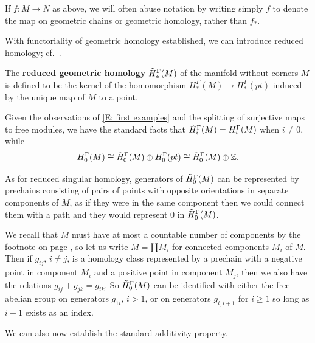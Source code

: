 If $f \colon M \to N$ as above, we will often abuse notation by writing simply $f$ to denote the map on geometric chains or geometric homology, rather than $f_*$.

With functoriality of geometric homology established, we can introduce reduced homology; cf.\ \cite[page 200]{Span81}.

\begin{definition}\label{D: reduced}
	The \textbf{reduced geometric homology} $\tilde H_*^\Gamma(M)$ of the manifold without corners $M$ is defined to be the kernel of the homomorphism $H_*^\Gamma(M) \to H_*^\Gamma(pt)$ induced by the unique map of $M$ to a point.
\end{definition}

\begin{remark}\label{R: reduced h}
Given the observations of \cref{E: first examples} and the splitting of surjective maps to free modules, we have the standard facts that $\tilde H_i^\Gamma(M) = H_i^\Gamma(M)$ when $i \neq 0$, while $$H_0^\Gamma(M) \cong \tilde H_0^\Gamma(M) \oplus H_0^\Gamma(pt) \cong \tilde H_0^\Gamma(M) \oplus \mathbb{Z}.$$

As for reduced singular homology, generators of $\tilde H_0^\Gamma(M)$ can be represented by prechains consisting of pairs of points with opposite orientations in separate components of $M$, as if they were in the same component then we could connect them with a path and they would represent $0$ in $\tilde H_0^\Gamma(M)$.

We recall that $M$ must have at most a countable number of components by the footnote on page \pageref{F: countable}, so let us write $M = \amalg M_i$ for connected components $M_i$ of $M$.
Then if $g_{ij}$, $i \neq j$, is a homology class represented by a prechain with a negative point in component $M_i$ and a positive point in component $M_j$, then we also have the relations $g_{ij}+g_{jk}=g_{ik}$.
So $\tilde H_0^\Gamma(M)$ can be identified with either the free abelian group on generators $g_{1i}$, $i>1$, or on generators $g_{i,i+1}$ for $i \geq 1$ so long as $i+1$ exists as an index.
\end{remark}

We can also now establish the standard additivity property.

